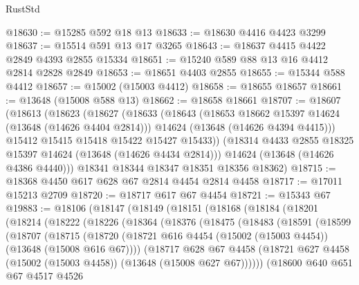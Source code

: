 \begin{lexlean}{RustStd}
\begin{coremodule}
@18630 := @15285 @592 @18 @13
@18633 := @18630 @4416 @4423 @3299
@18637 := @15514 @591 @13 @17 @3265
@18643 := @18637 @4415 @4422 @2849 @4393 @2855 @15334
@18651 := @15240 @589 @88 @13 @16 @4412 @2814 @2828 @2849
@18653 := @18651 @4403 @2855
@18655 := @15344 @588 @4412
@18657 := @15002 (@15003 @4412)
@18658 := @18655 @18657
@18661 := @13648 (@15008 @588 @13)
@18662 := @18658 @18661
@18707 := @18607
    (@18613
      (@18623
        (@18627
          (@18633
            (@18643
              (@18653 @18662 @15397 @14624 (@13648 (@14626 @4404 @2814)))
              @14624
              (@13648 (@14626 @4394 @4415)))
            @15412
            @15415
            @15418
            @15422
            @15427
            @15433))
        (@18314 @4433 @2855 @18325 @15397 @14624 (@13648 (@14626 @4434 @2814)))
        @14624
        (@13648 (@14626 @4386 @4440)))
      @18341
      @18344
      @18347
      @18351
      @18356
      @18362)
@18715 := @18368 @4450 @617 @628 @67 @2814 @4454 @2814 @4458
@18717 := @17011 @15213 @2709
@18720 := @18717 @617 @67 @4454
@18721 := @15343 @67
@19883 := @18106
    (@18147
      (@18149
        (@18151
          (@18168
            (@18184
              (@18201
                (@18214
                  (@18222
                    (@18226
                      (@18364
                        (@18376
                          (@18475
                            (@18483
                              (@18591
                                (@18599
                                  (@18707
                                    (@18715
                                      (@18720
                                        (@18721
                                          @616
                                          @4454
                                          (@15002 (@15003 @4454))
                                          (@13648 (@15008 @616 @67))))
                                      (@18717
                                        @628
                                        @67
                                        @4458
                                        (@18721
                                          @627
                                          @4458
                                          (@15002 (@15003 @4458))
                                          (@13648 (@15008 @627 @67))))))
                                  (@18600
                                    @640
                                    @651
                                    @67
                                    @4517
                                    @4526

\end{coremodule}
\end{lexlean}
